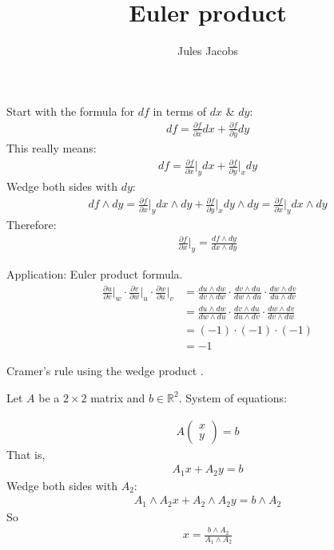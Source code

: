 \documentclass[a4paper, 11pt]{article}
\title{Euler product}
\author{Jules Jacobs}
\newcommand{\R}{\mathbb{R}}
\theoremstyle{definition}
\begin{document}
\maketitle

\begin{abstract}
\end{abstract}

Start with the formula for $df$ in terms of $dx$ \& $dy$:
\begin{align*}
  df = \frac{\partial f}{\partial x} dx
     + \frac{\partial f}{\partial y} dy
\end{align*}
This really means:
\begin{align*}
  df = \frac{\partial f}{\partial x}\bigg\rvert_y dx
     + \frac{\partial f}{\partial y}\bigg\rvert_x dy
\end{align*}
Wedge both sides with $dy$:
\begin{align*}
  df \wedge dy
  = \frac{\partial f}{\partial x}\bigg\rvert_y dx \wedge dy + \frac{\partial f}{\partial y}\bigg\rvert_x dy \wedge dy
  = \frac{\partial f}{\partial x}\bigg\rvert_y dx \wedge dy
\end{align*}
Therefore:
\begin{align*}
  \frac{\partial f}{\partial x}\bigg\rvert_y =
  \frac{df \wedge dy}{dx \wedge dy}
\end{align*}

Application: Euler product formula.
\begin{align*}
  \frac{\partial u}{\partial v}\bigg\rvert_w \cdot
  \frac{\partial v}{\partial w}\bigg\rvert_u \cdot
  \frac{\partial w}{\partial u}\bigg\rvert_v
&=\frac{du \wedge dw}{dv \wedge dw} \cdot
  \frac{dv \wedge du}{dw \wedge du} \cdot
  \frac{dw \wedge dv}{du \wedge dv} \\
&=\frac{du \wedge dw}{dw \wedge du} \cdot
  \frac{dv \wedge du}{du \wedge dv} \cdot
  \frac{dw \wedge dv}{dv \wedge dw} \\
&= (-1) \cdot (-1) \cdot (-1) \\
&= -1
\end{align*}

\newpage
Cramer's rule using the wedge product \cite{joot}.

Let $A$ be a $2 \times 2$ matrix and $b \in \R^2$. System of equations:

\begin{align*}
  A\begin{pmatrix}x\\y\end{pmatrix} = b
\end{align*}
That is,
\begin{align*}
  A_1 x + A_2 y = b
\end{align*}
Wedge both sides with $A_2$:
\begin{align*}
  A_1 \wedge A_2 x + A_2 \wedge A_2 y = b \wedge A_2
\end{align*}
So
\begin{align*}
  x = \frac{b \wedge A_2}{A_1 \wedge A_2}
\end{align*}
\end{document}
